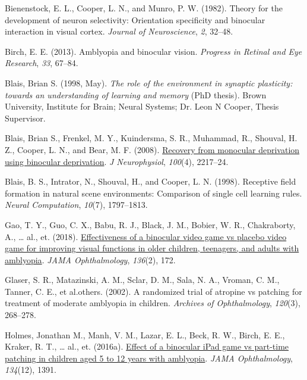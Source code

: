 \documentclass[
  onecolumn]{article}
\newlength{\cslhangindent}
\newenvironment{CSLReferences}[2] %
 {%
  \setlength{\parindent}{0pt}
  \ifodd #1 \everypar{\setlength{\hangindent}{\cslhangindent}}\ignorespaces\fi
  \ifnum #2 > 0
  \setlength{\parskip}{#2\baselineskip}
  \fi
 }%
 {}
\begin{document}
\hypertarget{refs}{}
\begin{CSLReferences}{1}{0}
\leavevmode{}%
Bienenstock, E. L., Cooper, L. N., and Munro, P. W. (1982). Theory for
the development of neuron selectivity: Orientation specificity and
binocular interaction in visual cortex. \emph{Journal of Neuroscience},
\emph{2}, 32--48.

\leavevmode{}%
Birch, E. E. (2013). Amblyopia and binocular vision. \emph{Progress in
Retinal and Eye Research}, \emph{33}, 67--84.

\leavevmode{}%
Blais, Brian S. (1998, May). \emph{The role of the environment in
synaptic plasticity:\\
towards an understanding of learning and memory} (PhD thesis). Brown
University, Institute for Brain; Neural Systems; Dr. Leon N Cooper,
Thesis Supervisor.

\leavevmode{}%
Blais, Brian S., Frenkel, M. Y., Kuindersma, S. R., Muhammad, R.,
Shouval, H. Z., Cooper, L. N., and Bear, M. F. (2008).
\href{https://doi.org/10.1152/jn.90411.2008}{Recovery from monocular
deprivation using binocular deprivation}. \emph{J Neurophysiol},
\emph{100}(4), 2217--24.

\leavevmode{}%
Blais, B. S., Intrator, N., Shouval, H., and Cooper, L. N. (1998).
Receptive field formation in natural scene environments: Comparison of
single cell learning rules. \emph{Neural Computation}, \emph{10}(7),
1797--1813.

\leavevmode{}%
Gao, T. Y., Guo, C. X., Babu, R. J., Black, J. M., Bobier, W. R.,
Chakraborty, A., \ldots{} al., et. (2018).
\href{https://doi.org/10.1001/jamaophthalmol.2017.6090}{Effectiveness of
a binocular video game vs placebo video game for improving visual
functions in older children, teenagers, and adults with amblyopia}.
\emph{JAMA Ophthalmology}, \emph{136}(2), 172.

\leavevmode{}%
Glaser, S. R., Matazinski, A. M., Sclar, D. M., Sala, N. A., Vroman, C.
M., Tanner, C. E., et al.others. (2002). A randomized trial of atropine
vs patching for treatment of moderate amblyopia in children.
\emph{Archives of Ophthalmology}, \emph{120}(3), 268--278.

\leavevmode{}%
Holmes, Jonathan M., Manh, V. M., Lazar, E. L., Beck, R. W., Birch, E.
E., Kraker, R. T., \ldots{} al., et. (2016a).
\href{https://doi.org/10.1001/jamaophthalmol.2016.4262}{Effect of a
binocular iPad game vs part-time patching in children aged 5 to 12 years
with amblyopia}. \emph{JAMA Ophthalmology}, \emph{134}(12), 1391.


\end{CSLReferences}
\end{document}
